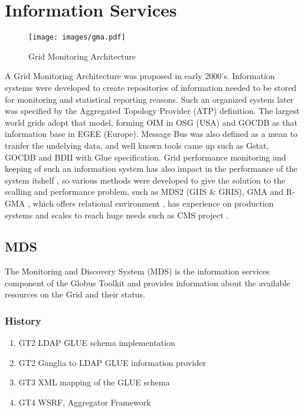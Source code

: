 \section{Information Services}
\begin{figure}[htb]
\centering
 \texttt{[image: images/gma.pdf]}
\caption{Grid Monitoring Architecture}
\label{figure:gma}
\end{figure}
A Grid Monitoring Architecture \cite{tierney2002grid} was proposed in early
2000's. Information systems were developed to create repositories of information
needed to be stored for monitoring and statistical reporting reasons. Such an
organized system later was specified by the Aggregated Topology Provider (ATP)
definition. The largest world grids adopt that model, forming OIM in OSG (USA)
and GOCDB as that information base in EGEE (Europe). Message Bus was also
defined as a mean to tranfer the undelying data, and well known tools came up
such as Gstat, GOCDB and BDII with Glue specification. Grid performance
monitoring and keeping of such an information system has also impact in the
performance of the system itshelf \cite{zhang2003performance}, so various
methods were developed to give the solution to the scalling and performance
problem, such as MDS2 (GIIS \& GRIS), GMA and R-GMA
\cite{wilson2004information}, which offers relational environment
\cite{fisher2001relational}, has experience on production systems 
\cite{byrom-production} and scales to reach huge needs such as CMS project
\cite{Bonacorsi2004,Byrom}.



\subsection{MDS}
The Monitoring and Discovery System (MDS) is the information services component
of the Globus Toolkit and provides information about the available resources on
the Grid and their status.
\subsubsection{History}
\begin{enumerate}
  \item{GT2} LDAP GLUE schema implementation
  \item{GT2} Ganglia to LDAP GLUE information provider
  \item{GT3} XML mapping of the GLUE schema
  \item{GT4} WSRF, Aggregator Framework
\end{enumerate}

